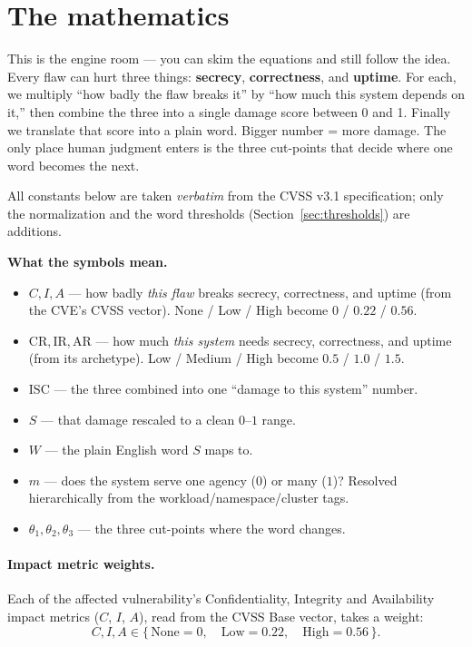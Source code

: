 \documentclass[11pt]{article}
\begin{document}
\section{The mathematics}
\label{sec:math}
\begin{plain}
This is the engine room --- you can skim the equations and still follow the idea.
Every flaw can hurt three things: \textbf{secrecy}, \textbf{correctness}, and
\textbf{uptime}. For each, we multiply ``how badly the flaw breaks it'' by ``how much
this system depends on it,'' then combine the three into a single damage score
between 0 and 1. Finally we translate that score into a plain word. Bigger number =
more damage. The only place human judgment enters is the three cut-points that decide
where one word becomes the next.
\end{plain}
All constants below are taken \emph{verbatim} from the CVSS v3.1 specification; only
the normalization and the word thresholds (Section~\ref{sec:thresholds}) are
additions.

\begin{plain}
\textbf{What the symbols mean.}
\begin{itemize}[leftmargin=1.3em,nosep,topsep=2pt]
\item $C, I, A$ --- how badly \emph{this flaw} breaks secrecy, correctness, and
  uptime (from the CVE's CVSS vector). None / Low / High become $0$ / $0.22$ / $0.56$.
\item $\mathrm{CR},\mathrm{IR},\mathrm{AR}$ --- how much \emph{this system} needs
  secrecy, correctness, and uptime (from its archetype). Low / Medium / High become
  $0.5$ / $1.0$ / $1.5$.
\item $\mathrm{ISC}$ --- the three combined into one ``damage to this system'' number.
\item $S$ --- that damage rescaled to a clean $0$--$1$ range.
\item $W$ --- the plain English word $S$ maps to.
\item $m$ --- does the system serve one agency ($0$) or many ($1$)? Resolved
  hierarchically from the workload/namespace/cluster tags.
\item $\theta_1,\theta_2,\theta_3$ --- the three cut-points where the word changes.
\end{itemize}
\end{plain}

\paragraph{Impact metric weights.}
Each of the affected vulnerability's Confidentiality, Integrity and Availability
impact metrics ($C$, $I$, $A$), read from the CVSS Base vector, takes a weight:
\[
C, I, A \in \{\,\text{None}=0,\quad \text{Low}=0.22,\quad \text{High}=0.56\,\}.
\]
\end{document}
